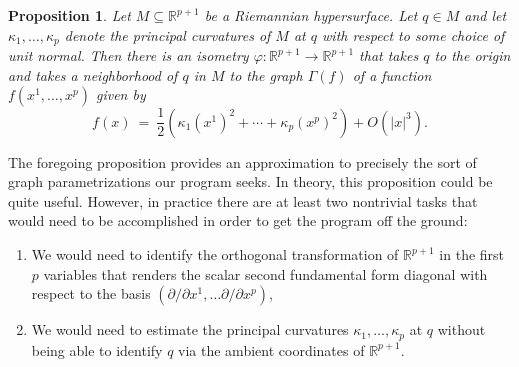 \documentclass[11pt]{article}
\newcommand{\be}{\begin{equation}}
\newcommand{\ee}{\end{equation}}
\newtheorem{prop}[thm]{Proposition}
\newcommand{\foh}{\frac{1}{2}}
\newcommand{\R}{\ensuremath{\mathbb{R}}}
\numberwithin{equation}{section}
\begin{document}
\begin{prop} Let $M \subseteq \R^{p+1}$ be a Riemannian hypersurface. Let $q \in M$ and let $\kappa_1, \ldots, \kappa_p$ denote the principal curvatures of $M$ at $q$ with respect to some choice of unit normal. Then there is an isometry $\varphi: \R^{p+1} \to \R^{p+1}$ that takes $q$ to the origin and takes a neighborhood of $q$ in $M$ to the graph $\Gamma(f)$ of a function $f(x^1, \ldots, x^p)$ given by
\be
	f(x) \ = \ \foh\left( \kappa_1(x^1)^2 + \cdots + \kappa_p(x^p)^2\right) + O(|x|^3).	
\ee
\end{prop}
The foregoing proposition provides an approximation to precisely the sort of graph parametrizations our program seeks. In theory, this proposition could be quite useful. However, in practice there are at least two nontrivial tasks that would need to be accomplished in order to get the program off the ground:
\begin{enumerate}
\item We would need to identify the orthogonal transformation of $\R^{p+1}$ in the first $p$ variables that renders the scalar second fundamental form diagonal with respect to the basis $(\partial/\partial x^1, \ldots \partial/\partial x^p)$,
\item We would need to estimate the principal curvatures $\kappa_1, \ldots, \kappa_p$ at $q$ without being able to identify $q$ via the ambient coordinates of $\R^{p+1}$. 
\end{enumerate}
\end{document}
